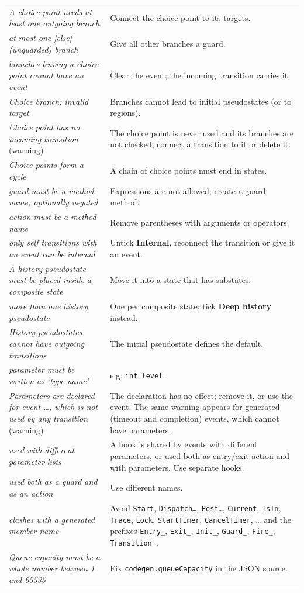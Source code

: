 \documentclass[11pt,a4paper,openany]{report}
\newcommand{\ui}[1]{\textsf{\textbf{#1}}}
\newcommand{\code}[1]{\texttt{#1}}
\begin{document}
\begin{longtable}{@{}p{6.3cm}p{8.1cm}@{}}
\emph{A choice point needs at least one outgoing branch} & Connect the choice point to its targets. \\
\emph{at most one [else] (unguarded) branch} & Give all other branches a guard. \\
\emph{branches leaving a choice point cannot have an event} & Clear the event; the incoming transition carries it. \\
\emph{Choice branch: invalid target} & Branches cannot lead to initial pseudostates (or to regions). \\
\emph{Choice point has no incoming transition} (warning) & The choice point is never used and its branches are not checked; connect a transition to it or delete it. \\
\emph{Choice points form a cycle} & A chain of choice points must end in states. \\
\emph{guard must be a method name, optionally negated} & Expressions are not allowed; create a guard method. \\
\emph{action must be a method name} & Remove parentheses with arguments or operators. \\
\emph{only self transitions with an event can be internal} & Untick \ui{Internal}, reconnect the transition or give it an event. \\
\emph{A history pseudostate must be placed inside a composite state} & Move it into a state that has substates. \\
\emph{more than one history pseudostate} & One per composite state; tick \ui{Deep history} instead. \\
\emph{History pseudostates cannot have outgoing transitions} & The initial pseudostate defines the default. \\
\emph{parameter must be written as 'type name'} & e.g. \code{int level}. \\
\emph{Parameters are declared for event \dots, which is not used by any transition} (warning) & The declaration has no effect; remove it, or use the event. The same warning appears for generated (timeout and completion) events, which cannot have parameters. \\
\emph{used with different parameter lists} & A hook is shared by events with different parameters, or used both as entry/exit action and with parameters. Use separate hooks. \\
\emph{used both as a guard and as an action} & Use different names. \\
\emph{clashes with a generated member name} & Avoid \code{Start}, \code{Dispatch\dots}, \code{Post\dots}, \code{Current}, \code{IsIn}, \code{Trace}, \code{Lock}, \code{StartTimer}, \code{CancelTimer}, \dots{} and the prefixes \code{Entry\_}, \code{Exit\_}, \code{Init\_}, \code{Guard\_}, \code{Fire\_}, \code{Transition\_}. \\
\emph{Queue capacity must be a whole number between 1 and 65535} & Fix \code{codegen.queueCapacity} in the JSON source. \\
\bottomrule
\end{longtable}
\end{document}
